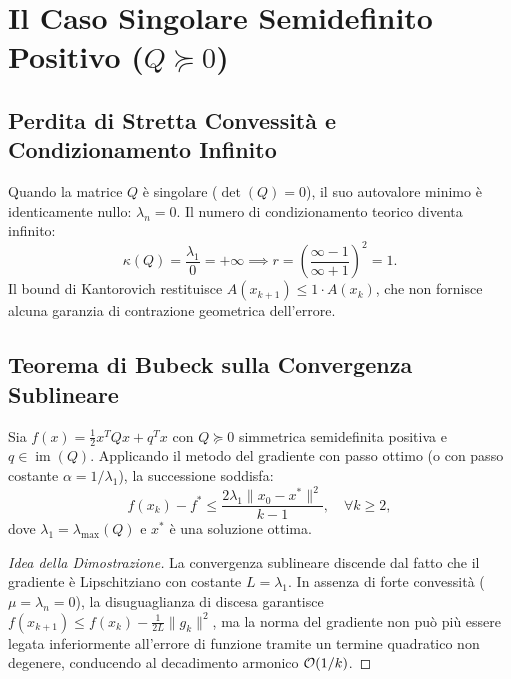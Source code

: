 \FloatBarrier
\section[Il Caso Singolare Semidefinito Positivo (Q >= 0)]{Il Caso Singolare Semidefinito Positivo ($Q \succeq 0$)}
\label{sec:caso-singolare-semidefinito}

\subsection{Perdita di Stretta Convessit\`a e Condizionamento Infinito}
Quando la matrice $Q$ \`e singolare ($\det(Q) = 0$), il suo autovalore minimo \`e identicamente nullo: $\lambda_n = 0$. Il numero di condizionamento teorico diventa infinito:
\begin{equation}
    \kappa(Q) = \frac{\lambda_1}{0} = +\infty \implies r = \left( \frac{\infty - 1}{\infty + 1} \right)^2 = 1.
\end{equation}
Il bound di Kantorovich restituisce $A(x_{k+1}) \le 1 \cdot A(x_k)$, che non fornisce alcuna garanzia di contrazione geometrica dell'errore.

\subsection{Teorema di Bubeck sulla Convergenza Sublineare}

\begin{theorem}
\label{thm:bubeck-sublineare}
Sia $f(x) = \frac{1}{2} x^T Q x + q^T x$ con $Q \succeq 0$ simmetrica semidefinita positiva e $q \in \operatorname{im}(Q)$. Applicando il metodo del gradiente con passo ottimo (o con passo costante $\alpha = 1/\lambda_1$), la successione soddisfa:
\begin{equation}
    f(x_k) - f^* \le \frac{2 \lambda_1 \|x_0 - x^*\|^2}{k - 1}, \quad \forall k \ge 2,
    \label{eq:bubeck-bound}
\end{equation}
dove $\lambda_1 = \lambda_{\max}(Q)$ e $x^*$ \`e una soluzione ottima.
\end{theorem}

\begin{proof}[Idea della Dimostrazione]
La convergenza sublineare discende dal fatto che il gradiente \`e Lipschitziano con costante $L = \lambda_1$. In assenza di forte convessit\`a ($\mu = \lambda_n = 0$), la disuguaglianza di discesa garantisce $f(x_{k+1}) \le f(x_k) - \frac{1}{2L} \|g_k\|^2$, ma la norma del gradiente non pu\`o pi\`u essere legata inferiormente all'errore di funzione tramite un termine quadratico non degenere, conducendo al decadimento armonico $\mathcal{O}\!\left(1/k\right)$.
\end{proof}

